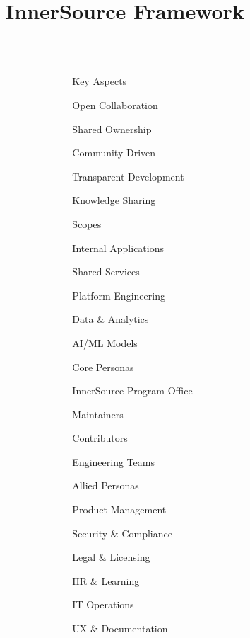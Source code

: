 \documentclass[final]{beamer}
\title{InnerSource Framework}
\author{}
\institute{Empowering Collaborative Development Within Organizations}
\date{}
\begin{document}
\begin{frame}[t]

\vspace{1in}

\begin{columns}[T]
\begin{column}{.1\textwidth}
\end{column}
\begin{column}{.25\textwidth}
\begin{innersourcesection}{\keyaspectsicon}{Key Aspects}
    \item Open Collaboration
    \item Shared Ownership
    \item Community Driven
    \item Transparent Development
    \item Knowledge Sharing
\end{innersourcesection}

\begin{innersourcesection}{\scopeicon}{Scopes}
    \item Internal Applications
    \item Shared Services
    \item Platform Engineering
    \item Data \& Analytics
    \item AI/ML Models
\end{innersourcesection}

\begin{innersourcesection}{\personasicon}{Core Personas}
    \item InnerSource Program Office
    \item Maintainers
    \item Contributors
    \item Engineering Teams
\end{innersourcesection}

\begin{innersourcesection}{\alliedicon}{Allied Personas}
    \item Product Management
    \item Security \& Compliance
    \item Legal \& Licensing
    \item HR \& Learning
    \item IT Operations
    \item UX \& Documentation
\end{innersourcesection}
\end{column}


\end{columns}
\end{frame}
\end{document}
